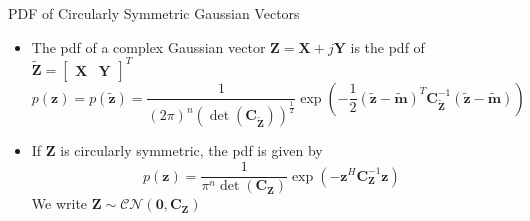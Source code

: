 \documentclass[t]{beamer}
\begin{document}
\begin{frame}{PDF of Circularly Symmetric Gaussian Vectors}
  \footnotesize
  \begin{itemize}
    \item \pause The pdf of a complex Gaussian vector $\mathbf{Z}=\mathbf{X}+j\mathbf{Y}$ is the pdf of $\tilde{\mathbf{Z}} = \begin{bmatrix} \mathbf{X} & \mathbf{Y} \end{bmatrix}^T$
      \begin{equation*}
      p(\mathbf{z}) = p(\tilde{\mathbf{z}}) = \frac{1}{(2\pi)^n(\det(\mathbf{C}_{\tilde{\mathbf{Z}}}))^{\frac{1}{2}}} \exp\left(-\frac{1}{2} (\tilde{\mathbf{z}}-\tilde{\mathbf{m}})^T\mathbf{C}_{\tilde{\mathbf{Z}}}^{-1}(\tilde{\mathbf{z}}-\tilde{\mathbf{m}})\right)
      \end{equation*}

    \item \pause If $\mathbf{Z}$ is circularly symmetric, the pdf is given by
      \begin{equation*}
      p(\mathbf{z}) = \frac{1}{\pi^n\det(\mathbf{C}_{\mathbf{Z}})} \exp\left(-\mathbf{z}^H\mathbf{C}_{\mathbf{Z}}^{-1}\mathbf{z}\right)
      \end{equation*}
      \pause We write $\mathbf{Z} \sim \mathcal{CN}(\mathbf{0}, \mathbf{C_Z})$
  \end{itemize}
  \normalsize
\end{frame}
\end{document}
